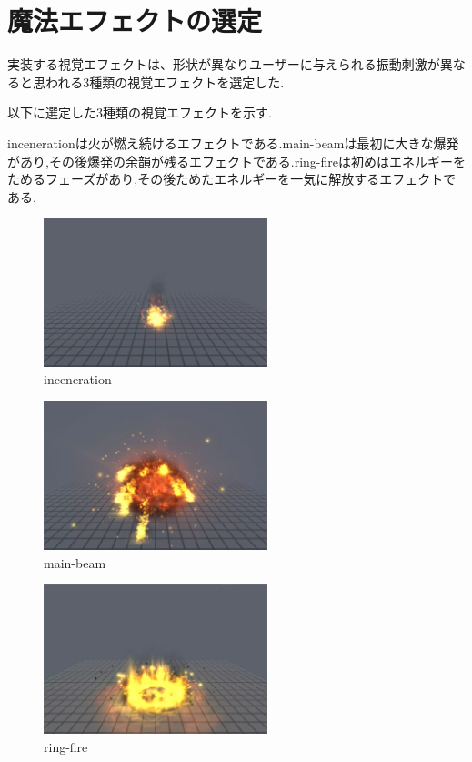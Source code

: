 \newpage

\section{魔法エフェクトの選定}
実装する視覚エフェクトは、形状が異なりユーザーに与えられる振動刺激が異なると思われる3種類の視覚エフェクトを選定した.

以下に選定した3種類の視覚エフェクトを示す.

incenerationは火が燃え続けるエフェクトである.main-beamは最初に大きな爆発があり,その後爆発の余韻が残るエフェクトである.ring-fireは初めはエネルギーをためるフェーズがあり,その後ためたエネルギーを一気に解放するエフェクトである.

\begin{figure}[h]
\centering
\includegraphics[clip,width=6.5cm]{./fig/firefire.png}
\caption{inceneration}\label{fire}
\end{figure}

\begin{figure}[h]
\centering
\includegraphics[clip,width=6.5cm]{./fig/explosion.png}
\caption{main-beam}\label{explosion}
\end{figure}

\begin{figure}[h]
\centering
\includegraphics[clip,width=6.5cm]{./fig/ringfire.png}
\caption{ring-fire}\label{ringfire}
\end{figure}


